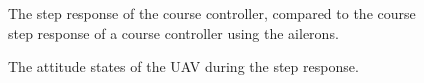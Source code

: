 \begin{figure}[]
    \centering
    \caption{The step response of the course controller, compared to the course step response of a course controller using the ailerons.}
	\label{fig:ratc_step_course}
\end{figure}

\begin{figure}[]
    \centering
    \caption{The attitude states of the UAV during the step response.}
	\label{fig:ratc_step_states}
\end{figure}

